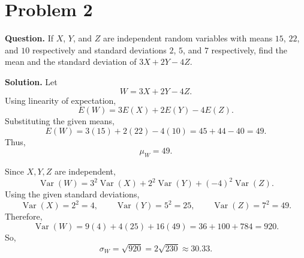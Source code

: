 \documentclass[11pt]{article}
\begin{document}
\section*{Problem 2}

\textbf{Question.} If $X$, $Y$, and $Z$ are independent random variables with means $15$, $22$, and $10$ respectively and standard deviations $2$, $5$, and $7$ respectively, find the mean and the standard deviation of $3X+2Y-4Z$.

\textbf{Solution.} Let
\[
W=3X+2Y-4Z.
\]
Using linearity of expectation,
\[
E(W)=3E(X)+2E(Y)-4E(Z).
\]
Substituting the given means,
\[
E(W)=3(15)+2(22)-4(10)=45+44-40=49.
\]
Thus,
\[
\boxed{\mu_W=49}.
\]

Since $X,Y,Z$ are independent,
\[
\operatorname{Var}(W)=3^2\operatorname{Var}(X)+2^2\operatorname{Var}(Y)+(-4)^2\operatorname{Var}(Z).
\]
Using the given standard deviations,
\[
\operatorname{Var}(X)=2^2=4, \qquad \operatorname{Var}(Y)=5^2=25, \qquad \operatorname{Var}(Z)=7^2=49.
\]
Therefore,
\[
\operatorname{Var}(W)=9(4)+4(25)+16(49)=36+100+784=920.
\]
So,
\[
\boxed{\sigma_W=\sqrt{920}=2\sqrt{230}\approx 30.33}.
\]

\newpage
\end{document}

